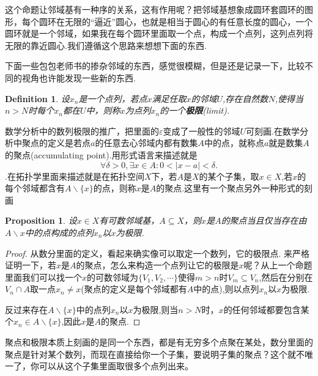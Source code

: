 \documentclass{article}
\newtheorem{proposition}[theorem]{Proposition}
\newtheorem{definition}[theorem]{Definition}
\begin{document}
这个命题让邻域基有一种序的关系，这有作用呢？把邻域基想象成圆环套圆环的图形，每个圆环在无限的“逼近”圆心，也就是相当于圆心的有任意长度的圆心，一个圆环就是一个邻域，如果我在每个圆环里面取一个点，构成一个点列，这列点列将无限的靠近圆心.我们遵循这个思路来想想下面的东西.

下面一些包包老师书的掺杂邻域的东西，感觉很模糊，但是还是记录一下，比较不同的视角也许能发现一些新的东西.
\begin{definition}
设${x_n}$是一个点列，若点$x$满足任取$x$的邻域$U$,存在自然数$N$,使得当$n > N$时每个$x_n$都在$U$中，则称$x$为点列${x_n}$的一个\textbf{极限}(limit).
\end{definition}

数学分析中的数列极限的推广，把里面的$\varepsilon$变成了一般性的邻域$U$可刻画.在数学分析中聚点的定义是若点$a$的任意去心邻域内都有数集$A$中的点，就称点$a$就是数集$A$的聚点(accumulating point).用形式语言来描述就是\[\forall \delta > 0,\exists x \in A \colon 0 < |x-a| < \delta.\].在拓扑学里面来描述就是在拓扑空间$X$下，若$A$是$X$的某个子集，取$x \in X$,若$x$的每个邻域都含有$A \smallsetminus \{x\}$的点，则称$x$是$A$的聚点.这里有一个聚点另外一种形式的刻画

\begin{proposition}
设$x \in X$有可数邻域基，$A \subseteq X$，则$x$是$A$的聚点当且仅当存在由$A \smallsetminus {x}$中的点构成的点列${x_n}$以$x$为极限.
\end{proposition}

\begin{proof}
从数分里面的定义，看起来确实像可以取定一个数列，它的极限点. 来严格证明一下，若$x$是$A$的聚点，怎么来构造一个点列让它的极限是$x$呢？从上一个命题里面我们可以找一个$x$的可数邻域为$\{V_1,V_2,\cdots\}$使得$m > n$时$V_m \subseteq V_n$,然后在分别在$V_n \cap A$取一点$x_n \neq x$(聚点的定义是每个邻域都有$A$中的点),则以点列${x_n}$以$x$为极限.

反过来存在$A \smallsetminus \{x\}$中的点列${x_n}$以$x$为极限,则当$n >N$时，$x$的任何邻域都要包含某个$x_n \in A \smallsetminus \{x\}$,因此$x$是$A$的聚点.
\end{proof}

聚点和极限本质上刻画的是同一个东西，都是有无穷多个点聚在某处，数分里面的聚点是针对某个数列，而现在直接给你一个子集，要说明子集的聚点？这个就不唯一了，你可以从这个子集里面取很多个点列出来。


\end{document}
